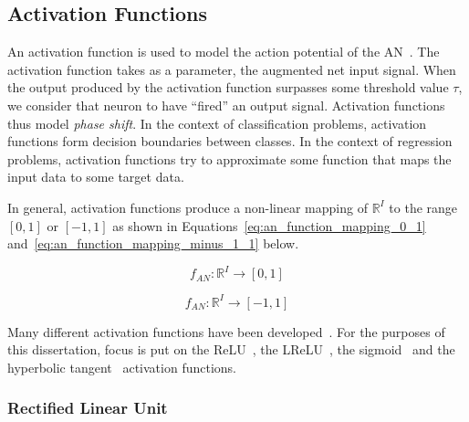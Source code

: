 \subsection{Activation Functions}\label{sec:anns:an:act_functions}

An activation function is used to model the action potential of the \acs{AN}~\cite{ref:ziv:1994, ref:hodgkin:1952}. The activation function takes as a parameter, the augmented net input signal. When the output produced by the activation function surpasses some threshold value $\tau$, we consider that neuron to have ``fired'' an output signal. Activation functions thus model \textit{phase shift}. In the context of classification problems, activation functions form decision boundaries between classes. In the context of regression problems, activation functions try to approximate some function that maps the input data to some target data.

In general, activation functions produce a non-linear mapping of $\mathbb{R}^{I}$ to the range $[0,1]$ or $[-1,1]$ as shown in Equations~\eqref{eq:an_function_mapping_0_1} and~\eqref{eq:an_function_mapping_minus_1_1} below.

\begin{equation}
      f_{AN}: \mathbb{R}^{I} \rightarrow [0,1]
      \label{eq:an_function_mapping_0_1}
\end{equation}

\begin{equation}
      f_{AN}: \mathbb{R}^{I} \rightarrow [-1,1]
      \label{eq:an_function_mapping_minus_1_1}
\end{equation}

Many different activation functions have been developed~\cite{ref:karlik:2011}. For the purposes of this dissertation, focus is put on the \acf{ReLU}~\cite{ref:jarrett:2009, ref:nair:2010}, the \acf{LReLU}~\cite{ref:maas:2013}, the sigmoid~\cite{ref:lecun:1988} and the hyperbolic tangent~\cite{ref:lin:2008} activation functions.


\subsubsection{Rectified Linear Unit}\label{sec:anns:an:act_functions:relu}

